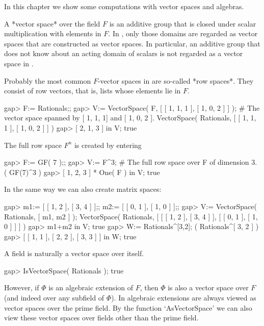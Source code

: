 
In this chapter we show some computations with vector spaces and
algebras.


A *vector space* over the field $F$ is an additive group that is closed
under scalar multiplication with elements in $F$.
In {\GAP}, only those domains are regarded as vector spaces that are
constructed as vector spaces.
In particular, an additive group that does not know about an
acting domain of scalars is not regarded as a vector space in {\GAP}.

Probably the most common $F$-vector spaces in {\GAP} are so-called
*row spaces*.
They consist of row vectors, that is, lists whose elements lie in $F$.

\beginexample
    gap> F:= Rationals;;
    gap> V:= VectorSpace( F, [ [ 1, 1, 1 ], [ 1, 0, 2 ] ] );
    # The vector space spanned by [ 1, 1, 1] and [ 1, 0, 2 ].
    VectorSpace( Rationals, [ [ 1, 1, 1 ], [ 1, 0, 2 ] ] )
    gap> [ 2, 1, 3 ] in V;
    true
\endexample

The full row space $F^n$ is created by entering

\beginexample
    gap> F:= GF( 7 );;
    gap> V:= F^3;                                           
    # The full row space over F of dimension 3. 
    ( GF(7)^3 )
    gap> [ 1, 2, 3 ] * One( F ) in V;  
    true
\endexample

In the same way we can also create matrix spaces:

\beginexample
   gap> m1:= [ [ 1, 2 ], [ 3, 4 ] ];; m2:= [ [ 0, 1 ], [ 1, 0 ] ];;
   gap> V:= VectorSpace( Rationals, [ m1, m2 ] );
   VectorSpace( Rationals, [ [ [ 1, 2 ], [ 3, 4 ] ], [ [ 0, 1 ], [ 1, 0 ] ] ] )
   gap> m1+m2 in V;
   true
   gap> W:= Rationals^[3,2];
   ( Rationals^[ 3, 2 ] )
   gap> [ [ 1, 1 ], [ 2, 2 ], [ 3, 3 ] ] in W;
   true
\endexample

A field is naturally a vector space over itself. 

\beginexample
    gap> IsVectorSpace( Rationals );
    true
\endexample

However, if $\Phi$ is an algebraic extension of $F$, then $\Phi$ is
also a vector space over $F$ (and indeed over any subfield of $\Phi$).
In {\GAP} algebraic extensions are always viewed as vector spaces
over the prime field. By the function `AsVectorSpace' we can also view 
these vector spaces over fields other than the prime field.


